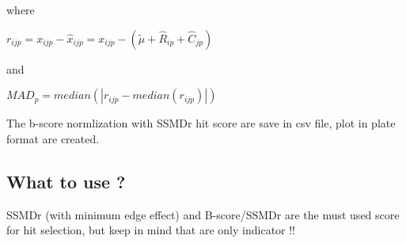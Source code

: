\documentclass[a4paper,10pt]{article}
\renewcommand{\arraystretch}{3}
\begin{document}
where 

\begin{center}
$r_{ijp} =  x_{ijp} -\hat{x}_{ijp} = x_{ijp} - ( \tilde{\mu} + \hat{R}_{ip} + \hat{C}_{jp})$
\end{center}

and 

\begin{center}
$MAD_{p}=median(|r_{ijp} - median(r_{ijp})|)$
\end{center}

The b-score normlization with SSMDr hit score are save in csv file, plot in plate format are created.

\subsection*{What to use ? }


SSMDr (with minimum edge effect) and B-score/SSMDr are the must used score for hit selection, but keep in mind that are only indicator !!

\renewcommand{\arraystretch}{1}
\end{document}
